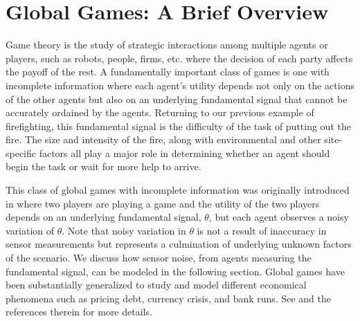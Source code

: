 \documentclass[conference]{ieeeconf}
\begin{document}
\section{Global Games: A Brief Overview}\label{sec:ggoverview}
Game theory is the study of strategic interactions among multiple agents or players, such as robots, people, firms, etc. where the decision of each party affects the payoff of the rest. A fundamentally important class of games is one with incomplete information where each agent's utility depends not only on the actions of the other agents but also on an underlying fundamental signal that cannot be accurately ordained by the agents. Returning to our previous example of firefighting, this fundamental signal is the difficulty of the task of putting out the fire. The size and intensity of the fire, along with environmental and other site-specific factors all play a major role in determining whether an agent should begin the task or wait for more help to arrive. 

This class of global games with incomplete information was originally introduced in \cite{Carlsson1993} where two players are playing a game and the utility of the two players depends on an underlying fundamental signal, $\theta$, but each agent observes a noisy variation of $\theta$. Note that noisy variation in $\theta$ is not a result of inaccuracy in sensor measurements but represents a culmination of underlying unknown factors of the scenario. We discuss how sensor noise, from agents measuring the fundamental signal, can be modeled in the following section. Global games have been substantially generalized to study and model different economical phenomena such as pricing debt, currency crisis, and bank runs. See \cite{Morris2000} and the references therein for more details.
\end{document}
